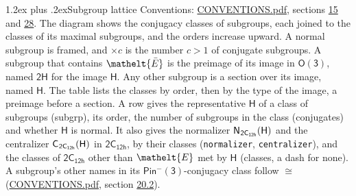 \documentclass[10pt,a4paper]{article}
\makeatletter
\renewcommand\section{\@startsection{section}{1}{\z@}{-3ex plus -1ex minus -.2ex}%
  {1.2ex plus .2ex}{\normalfont\large\sffamily\bfseries\color{parttitle}}}
\numberwithin{equation}{section}
\newcommand{\eltfont}[1]{{\let\sigma\eltsigma\mathelt{#1}}}
\newcommand{\grp}[1]{\mathsf{#1}}
\newcommand{\cls}[1]{\eltfont{#1}}
\newcommand{\elt}[1]{\eltfont{#1}}
\newcommand{\samecls}{\cong}
\newcommand{\barred}[1]{\bar{#1}}
\newcommand{\hairsp}{\mkern1mu}
\makeatother
\begin{document}
\section{Subgroup lattice}\label{s:subgroups}
Conventions: \href{../../CONVENTIONS.pdf}{CONVENTIONS.pdf}, sections \href{../../../rotation/CONVENTIONS.pdf\#conv.15}{15} and \href{../../CONVENTIONS.pdf\#conv.28}{28}.
The diagram shows the conjugacy classes of subgroups, each joined to the classes of its maximal subgroups, and the orders increase upward. \label{n:index.conjugates.c}A normal subgroup is framed, and ${\times}c$ is the number $c > 1$ of conjugate subgroups. \label{n:group.H}A subgroup that contains $\elt{\barred{E}}$ is the preimage of its image in $\grp{O(3)}$, named $\grp{2H}$ for the image $\grp{H}$. Any other subgroup is a section over its image, named $\grp{H}$. The table lists the classes by order, then by the type of the image, a preimage before a section. \label{n:head.subgroup}\label{n:head.order}\label{n:head.conjugates}\label{n:head.normal}A row gives the representative $\grp{H}$ of a class of subgroups (subgrp), its order, the number of subgroups in the class (conjugates) and whether $\grp{H}$ is normal. \label{n:group.normalizer}\label{n:group.centralizer}\label{n:head.classes}It also gives the normalizer $\grp{N}_{\hairsp \grp{2C_{12h}}}(\grp{H})$ and the centralizer $\grp{C}_{\hairsp \grp{2C_{12h}}}(\grp{H})$ in $\grp{2C_{12h}}$, by their classes (\texttt{normalizer}, \texttt{centralizer}), and the classes of $\grp{2C_{12h}}$ other than $\cls{E}$ met by $\grp{H}$ (classes, a dash for none). A subgroup's other names in its \href{Pinminus3.pdf}{$\grp{Pin^{-}(3)}$}-conjugacy class follow $\samecls$ (\href{../../CONVENTIONS.pdf}{CONVENTIONS.pdf}, section \href{../../CONVENTIONS.pdf\#conv.20.2}{20.2}).
\end{document}

